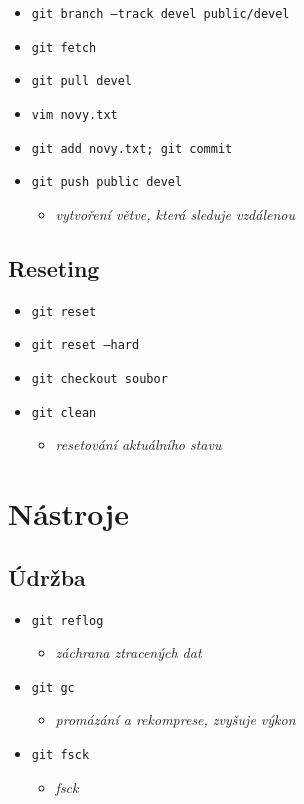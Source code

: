 \documentclass[10pt,twocolumn]{article}
\begin{document}
\begin{itemize}
	\item \texttt{git branch --track devel public/devel}
	\item \texttt{git fetch}
	\item \texttt{git pull devel}
	\item \texttt{vim novy.txt}
	\item \texttt{git add novy.txt; git commit}
	\item \texttt{git push public devel}
	\begin{itemize} \item \textit{vytvoření větve, která sleduje vzdálenou} \end{itemize}
\end{itemize}

\subsection{Reseting}

\begin{itemize}
	\item \texttt{git reset}
	\item \texttt{git reset --hard}
	\item \texttt{git checkout soubor}
	\item \texttt{git clean}
	\begin{itemize} \item \textit{resetování aktuálního stavu} \end{itemize}
\end{itemize}

\section{Nástroje}

\subsection{Údržba}

\begin{itemize}
	\item \texttt{git reflog}
	\begin{itemize} \item \textit{záchrana ztracených dat} \end{itemize}
	\item \texttt{git gc}
	\begin{itemize} \item \textit{promázání a rekomprese, zvyšuje výkon} \end{itemize}
	\item \texttt{git fsck}
	\begin{itemize} \item \textit{fsck} \end{itemize}
\end{itemize}
\end{document}

